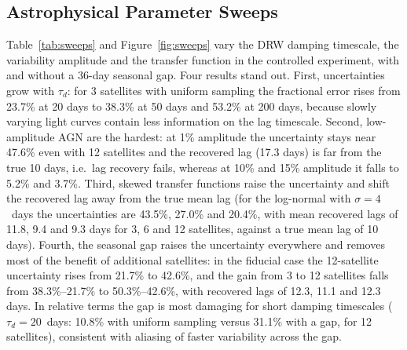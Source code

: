 \documentclass[11pt]{article}
\begin{document}
\subsection{Astrophysical Parameter Sweeps}
\label{sec:sweeps}

Table~\ref{tab:sweeps} and Figure~\ref{fig:sweeps} vary the DRW damping timescale, the variability amplitude and the transfer function in the controlled experiment, with and without a 36-day seasonal gap. Four results stand out. First, uncertainties grow with $\tau_d$: for 3 satellites with uniform sampling the fractional error rises from 23.7\% at 20 days to 38.3\% at 50 days and 53.2\% at 200 days, because slowly varying light curves contain less information on the lag timescale. Second, low-amplitude AGN are the hardest: at 1\% amplitude the uncertainty stays near 47.6\% even with 12 satellites and the recovered lag (17.3 days) is far from the true 10 days, i.e.\ lag recovery fails, whereas at 10\% and 15\% amplitude it falls to 5.2\% and 3.7\%. Third, skewed transfer functions raise the uncertainty and shift the recovered lag away from the true mean lag (for the log-normal with $\sigma = 4$~days the uncertainties are 43.5\%, 27.0\% and 20.4\%, with mean recovered lags of 11.8, 9.4 and 9.3 days for 3, 6 and 12 satellites, against a true mean lag of 10 days). Fourth, the seasonal gap raises the uncertainty everywhere and removes most of the benefit of additional satellites: in the fiducial case the 12-satellite uncertainty rises from 21.7\% to 42.6\%, and the gain from 3 to 12 satellites falls from 38.3\%--21.7\% to 50.3\%--42.6\%, with recovered lags of 12.3, 11.1 and 12.3 days. In relative terms the gap is most damaging for short damping timescales ($\tau_d = 20$~days: 10.8\% with uniform sampling versus 31.1\% with a gap, for 12 satellites), consistent with aliasing of faster variability across the gap.
\end{document}
